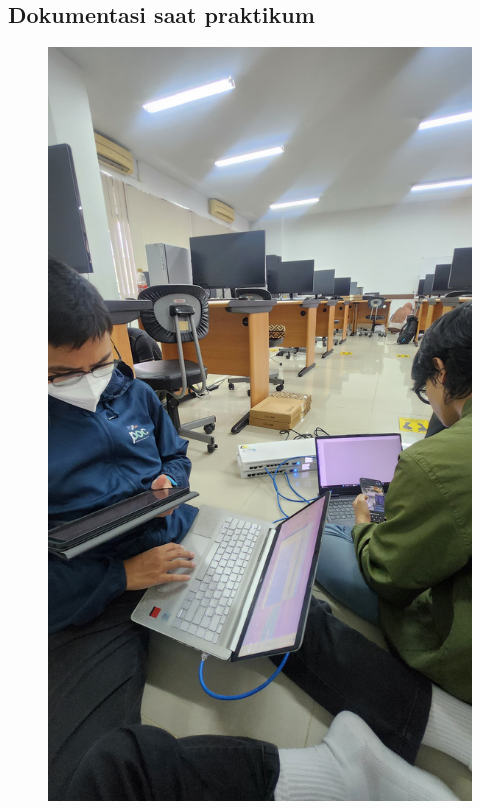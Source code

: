 \subsection{Dokumentasi saat praktikum}
    \begin{figure}[H]
        \centering
        \includegraphics[width=0.5\linewidth]{P1/img/dokum.jpg}
        \label{fig:gambar}
    \end{figure}